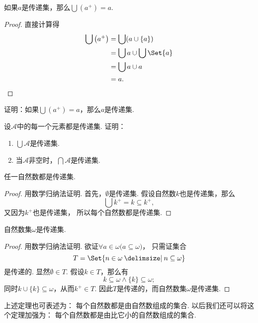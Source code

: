 \begin{theorem}
如果\(a\)是传递集，那么\(\bigcup\left( a^+ \right) = a\).
\begin{proof}
直接计算得\begin{align*}
	\bigcup\left( a^+ \right)
	&= \bigcup (a \cup \{a\}) \\
	&= \bigcup a \cup \bigcup\Set{a} \\
	&= \bigcup a \cup a \\
	&= a.
	\qedhere
\end{align*}
\end{proof}
\end{theorem}

\begin{example}
证明：如果\(\bigcup\left( a^+ \right) = a\)，那么\(a\)是传递集.
\end{example}

\begin{example}
设\(\mathscr{A}\)中的每一个元素都是传递集.
证明：\begin{enumerate}
	\item \(\bigcup \mathscr{A}\)是传递集.
	\item 当\(\mathscr{A}\)非空时，\(\bigcap \mathscr{A}\)是传递集.
\end{enumerate}
\end{example}

\begin{theorem}
任一自然数都是传递集.
\begin{proof}
用数学归纳法证明.
首先，\(\emptyset\)是传递集.
假设自然数\(k\)也是传递集，那么\[
	\bigcup k^+ = k \subseteq k^+,
\]
又因为\(k^+\)也是传递集，
所以每个自然数都是传递集.
\end{proof}
\end{theorem}

\begin{theorem}
自然数集\(\omega\)是传递集.
\begin{proof}
用数学归纳法证明.
欲证\(\forall a \in \omega \bigl(
	a \subseteq \omega
\bigr)\)，
只需证集合\[
	T = \Set{n \in \omega \given n \subseteq \omega}
\]是传递的.
显然\(\emptyset \in T\).
假设\(k \in T\)，那么有\[
	k \subseteq \omega
	\land
	\{k\} \subseteq \omega;
\]
同时\(k \cup \{k\} \subseteq \omega\)，从而\(k^+ \in T\).
因此\(T\)是传递的，而自然数集\(\omega\)是传递集.
\end{proof}
\end{theorem}
上述定理也可表述为：
每个自然数都是由自然数组成的集合.
以后我们还可以将这个定理加强为：
每个自然数都是由比它小的自然数组成的集合.

